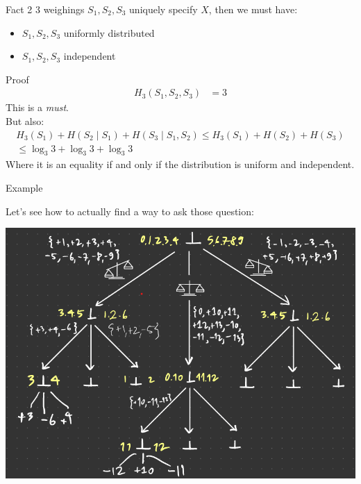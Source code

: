 \begin{parag}{Fact 2}
     3 weighings $S_1, S_2, S_3$ uniquely specify $X$, then we must have:
    \begin{itemize}
        \item $S_1, S_2, S_3$ uniformly distributed
        \item $S_1, S_2, S_3$ independent
    \end{itemize}

    \begin{subparag}{Proof}
        \begin{align*}
            H_3(S_1, S_2, S_3) &= 3
        \end{align*}
        This is a \textit{must}.\\
        But also:
        \begin{align*}
            H_3(S_1) + H(S_2 \mid  S_1) + H(S_3 \mid S_1, S_2) \leq H_3(S_1) + H(S_2) + H(S_3) \\
            \leq \log_3 3 + \log_3 3 + \log_3 3
        \end{align*}
        Where it is an equality if and only if the distribution is uniform and independent.
        
        
    \end{subparag}
    
   
\end{parag}
\begin{parag}{Example}


Let's see how to actually find a way to ask those question:
\begin{center}
    \includegraphics[scale=0.7]{52025-03-11.png}
\end{center}


\end{parag}
